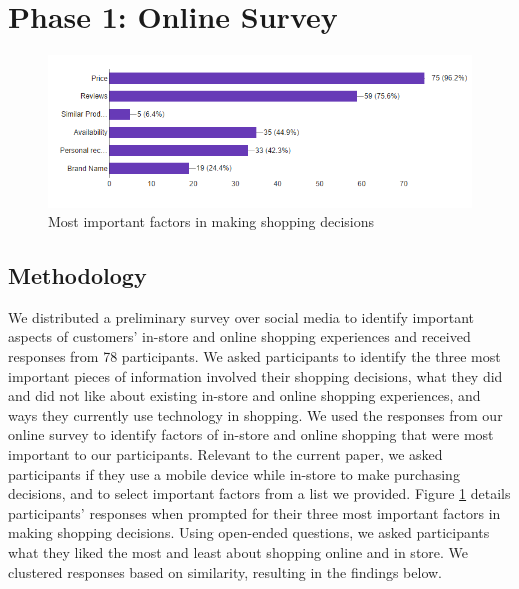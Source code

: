 \section{Phase 1: Online Survey}

\begin{figure}
	\includegraphics[width=0.9\columnwidth]{figures/ShoppingFactors}
	\caption{Most important factors in making shopping decisions}
	\label{figures:ShoppingFactors}
\end{figure}

 \subsection{Methodology}
We distributed a preliminary survey over social media to identify important aspects of customers' in-store and online shopping experiences and received responses from 78 participants. We asked participants to identify the three most important pieces of information involved their shopping decisions, what they did and did not like about existing in-store and online shopping experiences, and ways they currently use technology in shopping.   
We used the responses from our online survey to
identify 
factors of in-store and online shopping that were most important to our participants.  Relevant to the current paper, we asked participants if they use a mobile device while in-store to make purchasing decisions, and to select important factors from a list we provided. Figure \ref{figures:ShoppingFactors} details participants' responses when prompted for their three most important factors in making shopping decisions. Using open-ended questions, we asked participants what they liked the most and least about shopping online and in store. We clustered responses based on similarity, resulting in the findings below.

